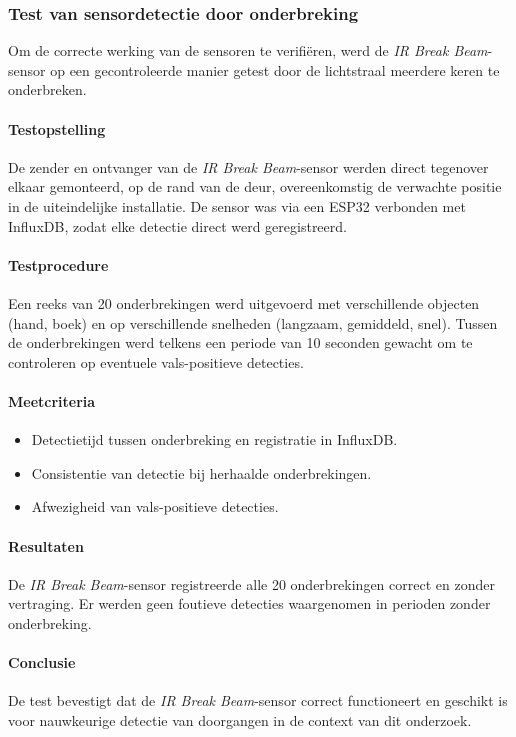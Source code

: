 \subsubsection{Test van sensordetectie door onderbreking}
Om de correcte werking van de sensoren te verifiëren, werd de \textit{IR Break Beam}-sensor op een gecontroleerde manier getest door de lichtstraal meerdere keren te onderbreken.

\paragraph{Testopstelling}
De zender en ontvanger van de \textit{IR Break Beam}-sensor werden direct tegenover elkaar gemonteerd, op de rand van de deur, overeenkomstig de verwachte positie in de uiteindelijke installatie. De sensor was via een ESP32 verbonden met InfluxDB, zodat elke detectie direct werd geregistreerd.

\paragraph{Testprocedure}
Een reeks van 20 onderbrekingen werd uitgevoerd met verschillende objecten (hand, boek) en op verschillende snelheden (langzaam, gemiddeld, snel). Tussen de onderbrekingen werd telkens een periode van 10 seconden gewacht om te controleren op eventuele vals-positieve detecties.

\paragraph{Meetcriteria}
\begin{itemize}
    \item Detectietijd tussen onderbreking en registratie in InfluxDB.
    \item Consistentie van detectie bij herhaalde onderbrekingen.
    \item Afwezigheid van vals-positieve detecties.
\end{itemize}

\paragraph{Resultaten}
De \textit{IR Break Beam}-sensor registreerde alle 20 onderbrekingen correct en zonder vertraging. Er werden geen foutieve detecties waargenomen in perioden zonder onderbreking.

\paragraph{Conclusie}
De test bevestigt dat de \textit{IR Break Beam}-sensor correct functioneert en geschikt is voor nauwkeurige detectie van doorgangen in de context van dit onderzoek.


